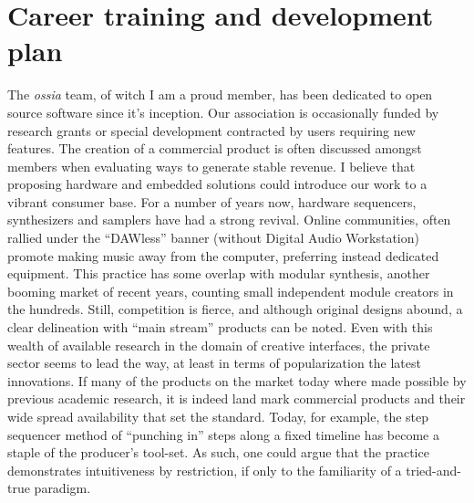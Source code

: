 \documentclass[journal,onecolumn]{IEEEtran}
\begin{document}
\section{Career training and development plan} %
The \textit{ossia} team, of witch I am a proud member, has been dedicated to open source software since it's inception. Our association is occasionally funded by research grants or special development contracted by users requiring new features. The creation of a commercial product is often discussed amongst members when evaluating ways to generate stable revenue. I believe that proposing hardware and embedded solutions could introduce our work to a vibrant consumer base. For a number of years now, hardware sequencers, synthesizers and samplers have had a strong revival. Online communities, often rallied under the ``DAWless'' banner (without Digital Audio Workstation) promote making music away from the computer, preferring instead dedicated equipment. This practice has some overlap with modular synthesis, another booming market of recent years, counting small independent module creators in the hundreds. Still, competition is fierce, and although original designs abound, a clear delineation with ``main stream'' products can be noted. Even with this wealth of available research in the domain of creative interfaces, the private sector seems to lead the way, at least in terms of popularization the latest innovations. If many of the products on the market today where made possible by previous academic research, it is indeed land mark commercial products and their wide spread availability that set the standard. Today, for example, the step sequencer method of ``punching in'' steps along a fixed timeline has become a staple of the producer's tool-set. As such, one could argue that the practice demonstrates intuitiveness by restriction, if only to the familiarity of a tried-and-true paradigm. 
\end{document}
